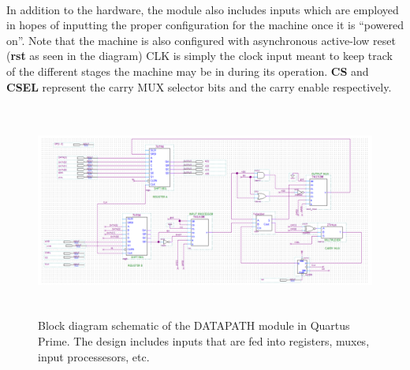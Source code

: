 \documentclass[11pt,a4paper,english]{article}
\begin{document}
 \paragraph*{}In addition to the hardware, the module also includes inputs which are employed in hopes of inputting the proper configuration for the machine once it is ``powered on''. Note that the machine is also configured with asynchronous active-low reset (\textbf{rst} as seen in the diagram) CLK is simply the clock input meant to keep track of the different stages the machine may be in during its operation. \textbf{CS} and \textbf{CSEL} represent the carry MUX selector bits and the carry enable respectively. 
\begin{figure}[!h]
  \centering
  \includegraphics[height=70mm]{./ss/DATAPATH.png}
  \caption{
    Block diagram schematic of the DATAPATH module in Quartus Prime. The design includes inputs that are fed into registers, muxes, input processesors, etc.
  }
  \label{figure}
\end{figure}
\end{document}
